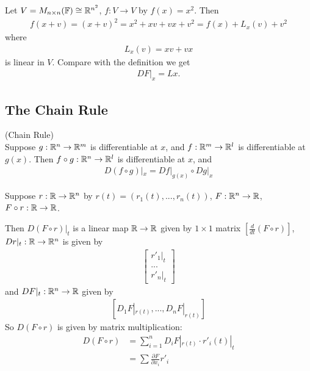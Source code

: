 \documentclass[a4paper]{article}
\begin{document}
\begin{eg}
Let $V=M_{n\times n} (\mathbb{F}) \cong \mathbb{R}^{n^2}$, $f:V \to V$ by $f(x)=x^2$. Then
\begin{equation*}
\begin{aligned}
f(x+v)=(x+v)^2=x^2+xv+vx+v^2=f(x)+L_x(v)+v^2
\end{aligned}
\end{equation*}
where 
\begin{equation*}
\begin{aligned}
L_x(v)=xv+vx
\end{aligned}
\end{equation*}
is linear in $V$. Compare with the definition we get
\begin{equation*}
\begin{aligned}
DF|_x = Lx.
\end{aligned}
\end{equation*}
\end{eg}

\subsection{The Chain Rule}
\begin{thm} (Chain Rule)\\
Suppose $g:\mathbb{R}^n \to \mathbb{R}^m$ is differentiable at $x$, and $f:\mathbb{R}^m \to \mathbb{R}^l$ is differentiable at $g(x)$. Then $f \circ g : \mathbb{R}^n \to \mathbb{R}^l$ is differentiable at $x$, and 
\begin{equation*}
\begin{aligned}
D(f\circ g)|_x = Df|_{g(x)} \circ Dg|_x
\end{aligned}
\end{equation*}
\end{thm}
\begin{eg}
Suppose $r:\mathbb{R} \to \mathbb{R}^n$ by $r(t)=(r_1(t),...,r_n(t))$, $F:\mathbb{R}^n \to \mathbb{R}$, $F \circ r:\mathbb{R} \to \mathbb{R}$.

Then $D(F\circ r)|_t$ is a linear map $\mathbb{R} \to \mathbb{R}$ given by $1\times 1$ matrix $[\frac{d}{dt}(F\circ r)]$, $Dr|_t:\mathbb{R}\to \mathbb{R}^n$ is given by
\begin{equation*}
\begin{aligned}
\left[\begin{matrix}
r'_1|_t\\
...\\
r'_n|_t
\end{matrix}\right]
\end{aligned}
\end{equation*}
and $DF|_t:\mathbb{R}^n \to \mathbb{R}$ given by
\begin{equation*}
\begin{aligned}
[D_1F|_{r(t)},...,D_nF|_{r(t)}]
\end{aligned}
\end{equation*}
So $D(F\circ r)$ is given by matrix multiplication:
\begin{equation*}
\begin{aligned}
D(F\circ r) &= \sum_{i=1}^n D_i F|_{r(t)} \cdot r'_i(t)|_t\\
&=\sum \frac{\partial F}{\partial x_i}r'_i
\end{aligned}
\end{equation*}
\end{eg}
\end{document}
